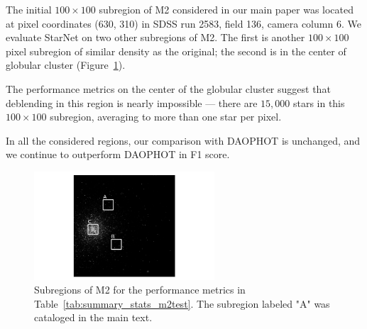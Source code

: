 
The initial $100\times100$ subregion of M2 considered in our main paper was located at pixel coordinates (630, 310) in SDSS run 2583, field 136, camera column 6. 
We evaluate StarNet on two other subregions of M2.
The first is another $100\times100$ pixel subregion of similar density as the original;
the second is in the center of globular cluster
(Figure~\ref{fig:m2_test_regions}).

The performance metrics on the center of the globular cluster 
suggest that deblending in this region is nearly impossible --- there are $15,000$ stars in this $100\times100$ subregion, 
averaging to more than one star per pixel. 

In all the considered regions, our comparison with DAOPHOT is unchanged, and we continue to outperform DAOPHOT in F1 score. 

\begin{figure}[tb]
    \centering
    \includegraphics[width=0.6\textwidth]{figures/m2_results/test_images.png}
    \vspace{-0.5cm}
    \caption{Subregions of M2 for the performance metrics in Table~\ref{tab:summary_stats_m2test}. The subregion labeled "A" was cataloged in the main text. 
}
    \label{fig:m2_test_regions}
\end{figure}



